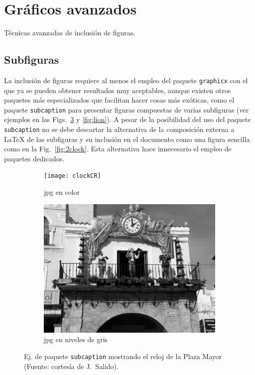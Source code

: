 \documentclass[11pt,a4paper]{article}
\begin{document}
\section{Gráficos avanzados}
Técnicas avanzadas de inclusión de figuras.

\subsection{Subfiguras}
La inclusión de figuras requiere al menos el empleo del paquete \texttt{graphicx} con el que ya se pueden obtener resultados muy aceptables, aunque existen otros paquetes más especializados que facilitan hacer cosas más exóticas, como el paquete \texttt{subcaption} para presentar figuras compuestas de varias subfiguras (ver ejemplos en las Figs.~\ref{fig:clock} y \ref{fig:lion}). A pesar de la posibilidad del uso del paquete \texttt{subcaption} no se debe descartar la alternativa de la composición externa a \LaTeX{} de las subfiguras y su inclusión en el documento como una figura sencilla como en la Fig.~\ref{fig:2clock}. Esta alternativa hace innecesario el empleo de paquetes dedicados.

\begin{figure}[H]
	\centering
	\begin{subfigure}[b]{0.3\textwidth}
		\centering
		\texttt{[image: clockCR]}
		\caption{jpg en color}\label{fig:clockCR}
	\end{subfigure}
	\begin{subfigure}[b]{0.3\textwidth}
		\centering
		\includegraphics[width=\textwidth]{clockCRbw}
		\caption{jpg en niveles de gris}\label{fig:clockCRbw}
	\end{subfigure}
	\caption[Comparación jpg color y niveles de gris]{Ej. de paquete \texttt{subcaption} mostrando el reloj de la Plaza Mayor (Fuente: cortesía de J.~Salido).}
	\label{fig:clock}
\end{figure}
\end{document}
